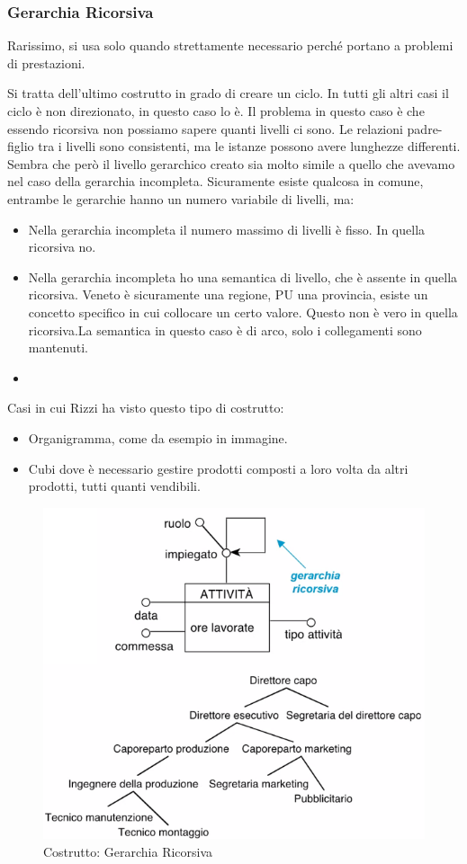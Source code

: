\subsubsection{Gerarchia Ricorsiva}
\begin{info}
	Rarissimo, si usa solo quando strettamente necessario perché portano a problemi di prestazioni.
\end{info}
Si tratta dell'ultimo costrutto in grado di creare un ciclo. In tutti gli altri casi il ciclo è non direzionato, in questo caso lo è.\newline
Il problema in questo caso è che essendo ricorsiva non possiamo sapere quanti livelli ci sono.\newline
Le relazioni padre-figlio tra i livelli sono consistenti, ma le istanze possono avere lunghezze differenti.\newline
Sembra che però il livello gerarchico creato sia molto simile a quello che avevamo nel caso della gerarchia incompleta. Sicuramente esiste qualcosa in comune, entrambe le gerarchie hanno un numero variabile di livelli, ma:
\begin{itemize}
	\item Nella gerarchia incompleta il numero massimo di livelli è fisso. In quella ricorsiva no.
	\item Nella gerarchia incompleta ho una semantica di livello, che è assente in quella ricorsiva. Veneto è sicuramente una regione, PU una provincia, esiste un concetto specifico in cui collocare un certo valore. Questo non è vero in quella ricorsiva.La semantica in questo caso è di arco, solo i collegamenti sono mantenuti.
	\item
\end{itemize}
Casi in cui Rizzi ha visto questo tipo di costrutto:
\begin{itemize}
	\item Organigramma, come da esempio in immagine.
	\item Cubi dove è necessario gestire prodotti composti a loro volta da altri prodotti, tutti quanti vendibili.
\end{itemize}
\begin{figure}[H]
	\begin{center}
		\includegraphics[width=0.6\linewidth]{img/recursive.png}
		\caption{Costrutto: Gerarchia Ricorsiva}
	\end{center}
\end{figure}

